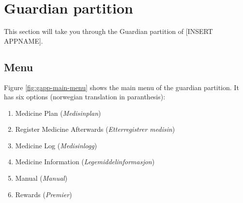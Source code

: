 % 	
% 	





\section{Guardian partition}
This section will take you through the Guardian partition of [INSERT APPNAME].

\subsection{Menu}
\label{sec:description-menu}
Figure \ref{fig:gapp-main-menu} shows the main menu of the guardian partition. It has six options (norwegian translation in paranthesis):
\begin{enumerate}
  \item Medicine Plan (\emph{Medisinplan})
  \item Register Medicine Afterwards (\emph{Etterregistrer medisin})
  \item Medicine Log (\emph{Medisinlogg})
  \item Medicine Information (\emph{Legemiddelinformasjon})
  \item Manual (\emph{Manual})
  \item Rewards (\emph{Premier})
\end{enumerate} 



